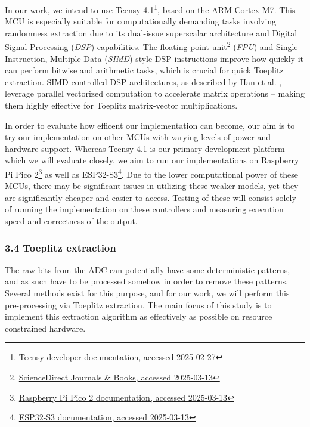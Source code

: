 \documentclass{sigchi}
\begin{document}
In our work, we intend to use Teensy 4.1\footnote{\href{https://www.pjrc.com/store/teensy41.html}{Teensy developer documentation, accessed 2025-02-27}}, based on the ARM Cortex-M7. This MCU is especially suitable for computationally demanding tasks involving randomness extraction due to its dual-issue superscalar architecture and Digital Signal Processing (\emph{DSP}) capabilities. The floating-point unit\footnote{\href{https://www.sciencedirect.com/topics/computer-science/floating-point-unit}{ScienceDirect Journals \& Books, accessed 2025-03-13}} (\emph{FPU}) and Single Instruction, Multiple Data (\emph{SIMD}) style DSP instructions improve how quickly it can perform bitwise and arithmetic tasks, which is crucial for quick Toeplitz extraction. SIMD-controlled DSP architectures, as described by Han et al. \cite{simd-dsp}, leverage parallel vectorized computation to accelerate matrix operations -- making them highly effective for Toeplitz matrix-vector multiplications.

In order to evaluate how efficent our implementation can become, our aim is to try our implementation on other MCUs with varying levels of power and hardware support. Whereas Teensy 4.1 is our primary development platform which we will evaluate closely, we aim to run our implementations on Raspberry Pi Pico 2\footnote{\href{https://datasheets.raspberrypi.com/pico/pico-2-product-brief.pdf}{Raspberry Pi Pico 2 documentation, accessed 2025-03-13}} as well as ESP32-S3\footnote{\href{https://www.espressif.com/sites/default/files/documentation/esp32-s3_datasheet_en.pdf}{ESP32-S3 documentation, accessed 2025-03-13}}. Due to the lower computational power of these MCUs, there may be significant issues in utilizing these weaker models, yet they are significantly cheaper and easier to access. Testing of these will consist solely of running the implementation on these controllers and measuring execution speed and correctness of the output.

\subsubsection{3.4 Toeplitz extraction}\label{toeplitz-extraction}

The raw bits from the ADC can potentially have some deterministic patterns, and as such have to be processed somehow in order to remove these patterns. Several methods exist for this purpose, and for our work, we will perform this pre-processing via Toeplitz extraction. The main focus of this study is to implement this extraction algorithm as effectively as possible on resource constrained hardware.
\end{document}
